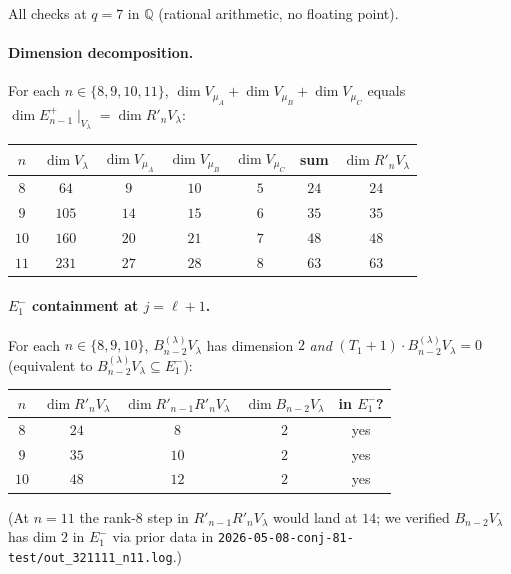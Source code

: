 \documentclass[11pt]{article}
\theoremstyle{definition}
\begin{document}
All checks at $q=7$ in $\mathbb{Q}$ (rational arithmetic, no
floating point).

\paragraph{Dimension decomposition.}  For each $n\in\{8,9,10,11\}$,
$\dim V_{\mu_A}+\dim V_{\mu_B}+\dim V_{\mu_C}$ equals
$\dim E_{n-1}^+\!\mid_{V_\lambda}=\dim R'_n V_\lambda$:

\begin{center}
\begin{tabular}{ccccccc}
\toprule
$n$ & $\dim V_\lambda$ & $\dim V_{\mu_A}$ & $\dim V_{\mu_B}$ & $\dim V_{\mu_C}$ & sum & $\dim R'_n V_\lambda$ \\
\midrule
$8$  & $64$  & $9$  & $10$ & $5$ & $24$ & $24$ \\
$9$  & $105$ & $14$ & $15$ & $6$ & $35$ & $35$ \\
$10$ & $160$ & $20$ & $21$ & $7$ & $48$ & $48$ \\
$11$ & $231$ & $27$ & $28$ & $8$ & $63$ & $63$ \\
\bottomrule
\end{tabular}
\end{center}

\paragraph{$E_1^-$ containment at $j=\ell+1$.}  For each
$n\in\{8,9,10\}$, $B_{n-2}^{(\lambda)} V_\lambda$ has dimension $2$
\emph{and} $(T_1{+}1)\cdot B_{n-2}^{(\lambda)} V_\lambda=0$
(equivalent to $B_{n-2}^{(\lambda)} V_\lambda\subseteq E_1^-$):

\begin{center}
\begin{tabular}{ccccc}
\toprule
$n$ & $\dim R'_n V_\lambda$ & $\dim R'_{n-1}R'_n V_\lambda$ & $\dim B_{n-2}V_\lambda$ & in $E_1^-$? \\
\midrule
$8$  & $24$ & $8$  & $2$ & yes \\
$9$  & $35$ & $10$ & $2$ & yes \\
$10$ & $48$ & $12$ & $2$ & yes \\
\bottomrule
\end{tabular}
\end{center}

(At $n=11$ the rank-$8$ step in $R'_{n-1}R'_n V_\lambda$ would land
at $14$; we verified $B_{n-2}V_\lambda$ has dim $2$ in $E_1^-$ via
prior data in \texttt{2026-05-08-conj-81-test/out\_321111\_n11.log}.)
\end{document}
